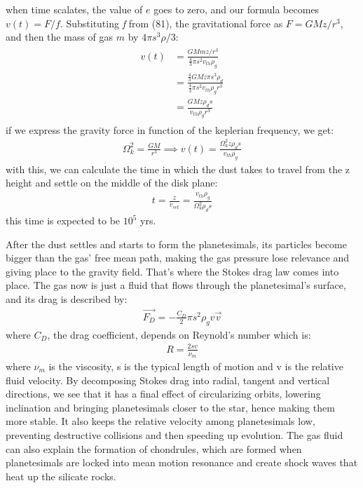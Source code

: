 \documentclass[12pt,a4paper]{article}
\begin{document}
when time scalates, the value of $e$ goes to zero, and our formula becomes $v(t)=F/f$. Substituting \textit{f} from (81), the gravitational force as $F=GMz/r^3$, and then the mass of gas $m$ by $4\pi s^3\rho/3$:
\begin{align}
\begin{split}
    v(t)&=\frac{GMmz/r^3}{\frac{4}{3}\pi s^2v_{th}\rho_g} \\
    &=\frac{\frac{4}{3}GMz\pi s^3\rho_d}{\frac{4}{3}\pi s^2v_{th}\rho_g r^3} \\
    &=\frac{GMz\rho_d s}{v_{th}\rho_g r^3}
\end{split}
\end{align}
if we express the gravity force in function of the keplerian frequency, we get:
\begin{align}
    \Omega_k^2=\frac{GM}{r^3}\implies v(t)=\frac{\Omega_k^2z\rho_d s}{v_{th}\rho_g}
\end{align}
with this, we can calculate the time in which the dust takes to travel from the z height and settle on the middle of the disk plane:
\begin{align}
    t=\frac{z}{v_{set}}=\frac{v_{th}\rho_g}{\Omega_k^2\rho_d s}
\end{align}
this time is expected to be $10^5$ yrs.

After the dust settles and starts to form the planetesimals, its particles become bigger than the gas' free mean path, making the gas pressure lose relevance and giving place to the gravity field. That's where the Stokes drag law comes into place. The gas now is just a fluid that flows through the planetesimal's surface, and its drag is described by:
\begin{align}
    \Vec{F_D}=-\frac{C_D}{2}\pi s^2\rho_gv\Vec{v}
\end{align}
where $C_D$, the drag coefficient, depends on Reynold's number which is:
\begin{align}
    R=\frac{2sv}{\nu_m}
\end{align}
where $\nu_m$ is the viscosity, s is the typical length of motion and v is the relative fluid velocity. By decomposing Stokes drag into radial, tangent and vertical directions, we see that it has a final effect of circularizing orbits, lowering inclination and bringing planetesimals closer to the star, hence making them more stable. It also keeps the relative velocity among planetesimals low, preventing destructive collisions and then speeding up evolution. The gas fluid can also explain the formation of chondrules, which are formed when planetesimals are locked into mean motion resonance and create shock waves that heat up the silicate rocks.
\end{document}
